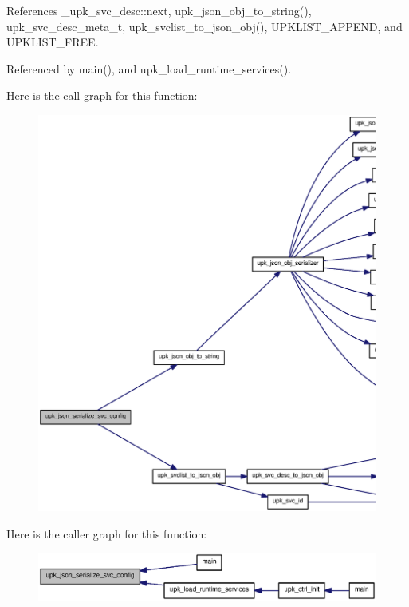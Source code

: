 References \_\-upk\_\-svc\_\-desc::next, upk\_\-json\_\-obj\_\-to\_\-string(), upk\_\-svc\_\-desc\_\-meta\_\-t, upk\_\-svclist\_\-to\_\-json\_\-obj(), UPKLIST\_\-APPEND, and UPKLIST\_\-FREE.



Referenced by main(), and upk\_\-load\_\-runtime\_\-services().



Here is the call graph for this function:
\nopagebreak
\begin{figure}[H]
\begin{center}
\leavevmode
\includegraphics[width=400pt]{group__config__impl_ga19d2bc0bd2e96a937820f26f4e56b2d9_cgraph}
\end{center}
\end{figure}




Here is the caller graph for this function:\nopagebreak
\begin{figure}[H]
\begin{center}
\leavevmode
\includegraphics[width=400pt]{group__config__impl_ga19d2bc0bd2e96a937820f26f4e56b2d9_icgraph}
\end{center}
\end{figure}



